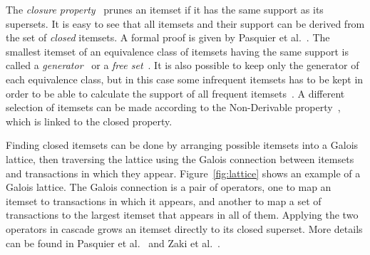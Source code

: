 \documentclass[letterpaper,12pt,titlepage,oneside,final]{book}
\begin{document}

The \emph{closure property}~\cite{pasquier1999discovering,pasquier1999efficient,zaki2002charm} prunes an itemset
if it has the same support as its supersets. 
It is easy to see that all itemsets and their support can be derived from the set of \emph{closed} itemsets. 
A formal proof is given by Pasquier et al.~\cite{pasquier1999discovering}.
The smallest itemset of an equivalence class of itemsets having the same support
is called a \emph{generator}~\cite{kryszkiewicz2001concise} or a \emph{free set}~\cite{boulicaut2000approximation}. 
It is also possible to keep only the generator of each equivalence class, 
but in this case some infrequent itemsets has to be kept 
in order to be able to calculate the support of all frequent itemsets~\cite{kryszkiewicz2001concise}. 
A different selection of itemsets can be made according to the Non-Derivable property~\cite{calders2002mining,calders2007non}, 
which is linked to the closed property. %

Finding closed itemsets can be done by arranging possible itemsets into a Galois lattice, 
then traversing the lattice using the Galois connection between itemsets and transactions
in which they appear. 
Figure~\ref{fig:lattice} shows an example of a Galois lattice. 
The Galois connection is a pair of operators, one to map an itemset to transactions in which it appears, 
and another to map a set of transactions to the largest itemset that appears in all of them.
Applying the two operators in cascade grows an itemset directly to its closed superset.
More details can be found in Pasquier et al.~\cite{pasquier1999efficient} and Zaki et al.~\cite{zaki2002charm}.
\end{document}

